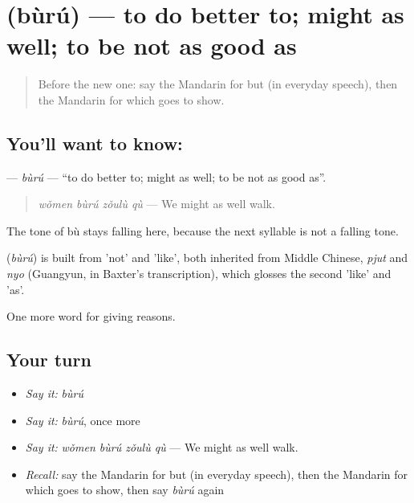 \section[\texorpdfstring{\zh{不如} (bùrú)}{不如 (bùrú)}]{ (bùrú) — to do better to; might as well; to be not as good as}

\label{lesson:ZH-C365-buru}



\begin{quote}
Before the new one: say the Mandarin for but (in everyday speech), then the Mandarin for which goes to show.
\end{quote}

\subsection*{You'll want to know: }
\textbf{} — \emph{bùrú} — \textquotedblleft{}to do better to; might as well; to be not as good as\textquotedblright{}.

\begin{quote}
\textbf{} \emph{wǒmen bùrú zǒulù qù} — We might as well walk.
\end{quote}

The tone of bù stays falling here, because the next syllable is not a falling tone.

\begin{cousinweb}
\textbf{} (\emph{bùrú}) is built from  'not' and  'like', both inherited from Middle Chinese, \emph{pjut} and \emph{nyo} (Guangyun, in Baxter's transcription), which glosses the second 'like' and 'as'.
\end{cousinweb}

\begin{grammarlens}[title={What you've built}]
One more word for giving reasons.
\end{grammarlens}

\subsection*{Your turn}
\begin{itemize}
\raggedright
  \item \emph{Say it:} \emph{bùrú}
  \item \emph{Say it:} \emph{bùrú}, once more
  \item \emph{Say it:} \emph{wǒmen bùrú zǒulù qù} — We might as well walk.
  \item \emph{Recall:} say the Mandarin for but (in everyday speech), then the Mandarin for which goes to show, then say \emph{bùrú} again
\end{itemize}


